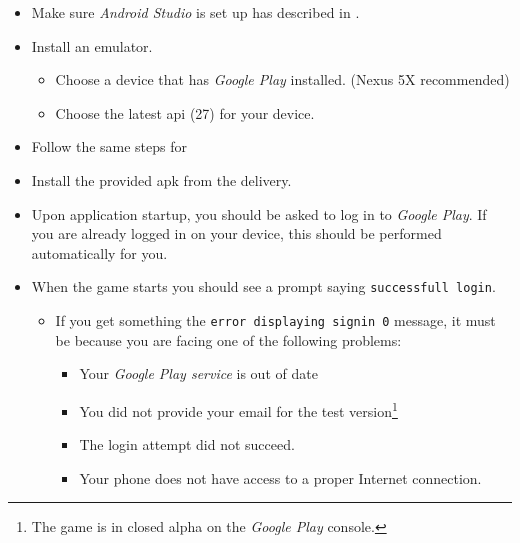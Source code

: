 
\begin{itemize}
	\item Make sure \textit{Android Studio} is set up has described in .
	\item Install an emulator.
	\begin{itemize}
		\item Choose a device that has \textit{Google Play} installed. (Nexus 5X recommended)
		\item Choose the latest \gls{api} (27) for your device.
  \end{itemize}
  \item Follow the same steps for 
\end{itemize}


\begin{itemize}
	\item Install the provided \gls{apk} from the delivery.
	\item Upon application startup, you should be asked to log in to \textit{Google Play}. If you are already logged in on your device, this should be performed automatically for you.
	\item When the game starts you should see a prompt saying \texttt{successfull login}.
	\begin{itemize}
		\item If you get something the \texttt{error displaying signin 0} message, it must be because you are facing one of the following problems:
    \begin{itemize}
      \item Your \textit{Google Play service} is out of date
      \item You did not provide your email for the test version\footnote{The game is in closed alpha on the \textit{Google Play} console.}
      \item The login attempt did not succeed. \item Your phone does not have access to a proper Internet connection.
    \end{itemize}
	\end{itemize}
\end{itemize}

